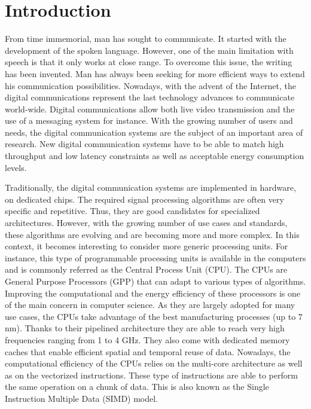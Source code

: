 
\graphicspath{{main/introduction/fig/}}

\chapter*{Introduction}

From time immemorial, man has sought to communicate. It started with the
development of the spoken language. However, one of the main limitation with
speech is that it only works at close range. To overcome this issue, the writing
has been invented. Man has always been seeking for more efficient ways to extend
his communication possibilities. Nowadays, with the advent of the Internet, the
digital communications represent the last technology advances to communicate
world-wide. Digital communications allow both live video transmission and the
use of a messaging system for instance. With the growing number of users and
needs, the digital communication systems are the subject of an important area of
research. New digital communication systems have to be able to match high
throughput and low latency constraints as well as acceptable energy consumption
levels.

Traditionally, the digital communication systems are implemented in hardware, on
dedicated chips. The required signal processing algorithms are often very
specific and repetitive. Thus, they are good candidates for specialized
architectures. However, with the growing number of use cases and standards,
these algorithms are evolving and are becoming more and more complex. In this
context, it becomes interesting to consider more generic processing units.
For instance, this type of programmable processing units is available in the
computers and is commonly referred as the Central Process Unit (CPU). The CPUs
are General Purpose Processors (GPP) that can adapt to various types of
algorithms. Improving the computational and the energy efficiency of these
processors is one of the main concern in computer science. As they are largely
adopted for many use cases, the CPUs take advantage of the best manufacturing
processes (up to 7 nm). Thanks to their pipelined architecture they are able to
reach very high frequencies ranging from 1 to 4 GHz. They also come with
dedicated memory caches that enable efficient spatial and temporal reuse of
data. Nowadays, the computational efficiency of the CPUs relies on the
multi-core architecture as well as on the vectorized instructions. These type of
instructions are able to perform the same operation on a chunk of data. This is
also known as the Single Instruction Multiple Data (SIMD) model.

